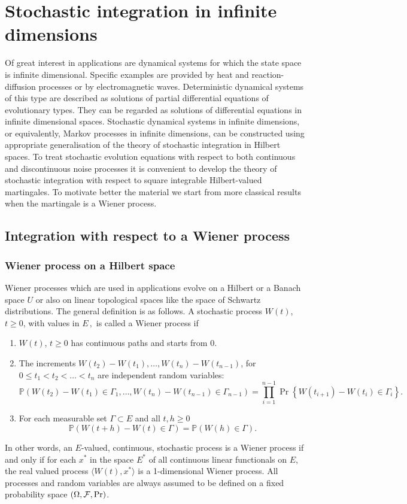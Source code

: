 \documentclass[preprint]{imsart}
\def\P{\mathbb P}
\begin{document}
{\chapter{Stochastic integration in infinite dimensions}
Of great interest in applications are  dynamical systems for which the state
space is infinite dimensional. Specific examples are provided by heat and reaction-diffusion processes or by
electromagnetic waves.
Deterministic dynamical systems of this type are described as solutions of partial differential equations of
evolutionary types. They can be  regarded as solutions of differential equations in infinite dimensional spaces.
Stochastic dynamical systems in infinite dimensions, or equivalently, Markov processes in infinite dimensions, can
be constructed  using appropriate generalisation of the theory of stochastic integration in Hilbert spaces.
To treat stochastic evolution equations with
respect to both continuous and discontinuous noise processes it is convenient to develop  the theory
of   stochastic integration   with respect to square
integrable Hilbert-valued martingales. To motivate better the material we start from more classical results when the
martingale is a Wiener process.
\section{Integration with respect to a Wiener process}
\subsection{Wiener process on a Hilbert space}
Wiener processes which are used
in applications evolve on  a Hilbert or a Banach space $U$ or also on linear topological spaces like  the space of Schwartz distributions.
The general  definition is as follows.  A
stochastic process $W(t)$, $t\geq 0$, with values in $E\,,$ is called a Wiener
process if
\begin{enumerate}
\item $W(t)$, $t\geq0$ has continuous paths and starts from $0$.
\item The increments $W(t_2) - W(t_1), \ldots, W(t_{n}) - W(t_{n-1})$,
for $0 \leq t_1 < t_2 < \ldots < t_{n}$ are independent random variables:
\begin{equation}
    \P \left(W(t_2) - W(t_1) \in \Gamma_1, \ldots,
    W(t_n) - W(t_{n-1}) \in \Gamma_{n-1}
    \right) = \prod_{i=1}^{n-1} \Pr \left\{ W(t_{i+1}) - W(t_i) \in \Gamma_i \right\}.
\end{equation}
\item For each measurable set  $\Gamma \subset E$ and all $t, h \geq 0$
$$
    \P\left(W(t+h) - W(t) \in \Gamma \right) =
    \P\left(W(h) \in \Gamma \right).
$$
\end{enumerate}
In other words, an $E$-valued, continuous, stochastic process is a Wiener
process if and only if for each $x^*$ in the space  $E^*$ of all continuous linear functionals on $E$, the real valued process $\langle
W(t), x^*\rangle$ is a 1-dimensional Wiener process.  All processes and random
variables are always assumed to be defined on a fixed probability space
$(\Omega, {\cal F}, \Pr)$.

}
\end{document}
